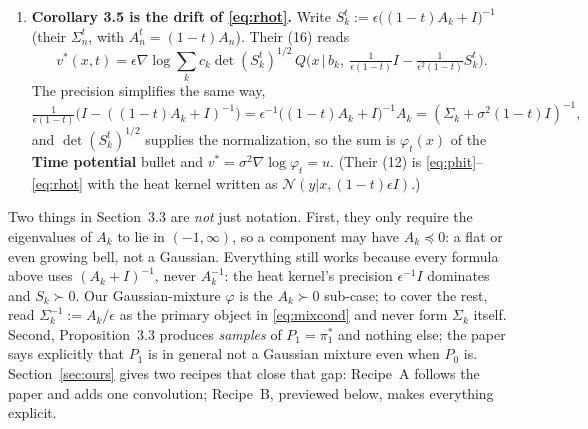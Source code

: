 \documentclass[11pt]{article}
\newcommand{\Nc}{\mathcal{N}}
\theoremstyle{definition}
\theoremstyle{plain}
\begin{document}
\begin{enumerate}
\[          \det(S_k)^{1/2}=\epsilon^{D/2}\det(A_k+I)^{-1/2}
          \propto\det(\Sigma_k)^{1/2}\det(\Sigma_k+\sigma^2I)^{-1/2}
        \]
        supplies exactly the normalizations that turn $c_k$ into $w_k$ and the bell into a
        density, up to the common factor $(2\pi\epsilon)^{D/2}$ that cancels in $\gamma_k$. Their
        normalizer $Z_x$ is our $\varphi_0(x)$ up to the same constant. Their appendix derivation
        (completing the square in the exponent, their (21) and following) is the product rule
        \eqref{eq:gprod} done by hand.
  \item \textbf{Corollary 3.5 is the drift of \eqref{eq:rhot}.} Write $S_k^t:=\epsilon\big((1-t)A_k+I\big)^{-1}$
        (their $\Sigma_n^t$, with $A_n^t=(1-t)A_n$). Their (16) reads
        \[
          v^*(x,t)=\epsilon\nabla\log\sum_kc_k\det(S_k^t)^{1/2}\,
          Q\Big(x\,\Big|\,b_k,\ \tfrac{1}{\epsilon(1-t)}I-\tfrac{1}{\epsilon^2(1-t)}S_k^t\Big).
        \]
        The precision simplifies the same way,
        \[
          \tfrac{1}{\epsilon(1-t)}\big(I-((1-t)A_k+I)^{-1}\big)=\epsilon^{-1}\big((1-t)A_k+I\big)^{-1}A_k
          =(\Sigma_k+\sigma^2(1-t)I)^{-1},
        \]
        and $\det(S^t_k)^{1/2}$ supplies the normalization, so the sum is $\varphi_t(x)$ of the
        \textbf{Time potential} bullet and $v^*=\sigma^2\nabla\log\varphi_t=u$. (Their (12) is
        \eqref{eq:phit}--\eqref{eq:rhot} with the heat kernel written as $\Nc(y|x,(1-t)\epsilon I)$.)
\end{enumerate}
Two things in Section~3.3 are \emph{not} just notation. First, they only require the eigenvalues of
$A_k$ to lie in $(-1,\infty)$, so a component may have $A_k\preceq0$: a flat or even growing
bell, not a Gaussian. Everything still works because every formula above uses $(A_k+I)^{-1}$,
never $A_k^{-1}$: the heat kernel's precision $\epsilon^{-1}I$ dominates and $S_k\succ0$.
Our Gaussian-mixture $\varphi$ is the $A_k\succ0$ sub-case; to cover the rest, read
$\Sigma_k^{-1}:=A_k/\epsilon$ as the primary object in \eqref{eq:mixcond} and never form
$\Sigma_k$ itself. Second, Proposition~3.3 produces \emph{samples} of $P_1=\pi^*_1$ and nothing
else; the paper says explicitly that $P_1$ is in general not a Gaussian mixture even when $P_0$
is. Section~\ref{sec:ours} gives two recipes that close that gap: Recipe~A follows the paper and adds one convolution; Recipe~B, previewed below, makes everything explicit.
\end{document}
